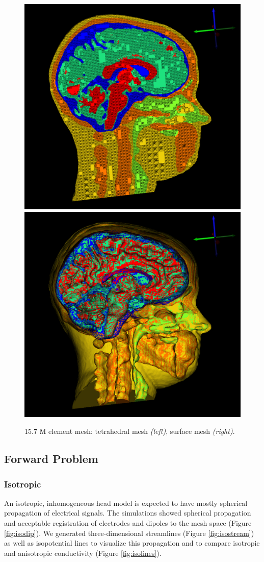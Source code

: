 \begin{figure}[H]
\begin{center}
\includegraphics[width=.49\textwidth]{Figures/smallmesh_2}
\includegraphics[width=.49\textwidth]{Figures/smallmesh_surface}
\caption{15.7 M element mesh: tetrahedral mesh \textit{(left)}, surface mesh \textit{(right)}.}
\label{fig:smallmesh}
\end{center}
\end{figure}

\subsection{Forward Problem}

\subsubsection{Isotropic}

An isotropic, inhomogeneous head model is expected to have mostly spherical propagation of electrical signals. The simulations showed spherical propagation and acceptable registration of electrodes and dipoles to the mesh space (Figure \ref{fig:isodip}). We generated three-dimensional streamlines (Figure \ref{fig:isostream}) as well as isopotential lines to visualize this propagation and to compare isotropic and anisotropic conductivity (Figure \ref{fig:isolines}). 

